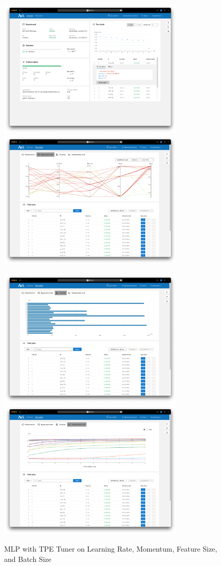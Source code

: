 \documentclass{article}
\begin{document}
\begin{figure}
    \centerline{\includegraphics[width=3.5in]{../proj3/figures/mlp_tpe_batch_overview.png}\includegraphics[width=3.5in]{../proj3/figures/mlp_tpe_batch_hyperparameter.png}}
    \centerline{\includegraphics[width=3.5in]{../proj3/figures/mlp_tpe_batch_latency.png}\includegraphics[width=3.5in]{../proj3/figures/mlp_tpe_batch_intermediate.png}}
    \caption{MLP with TPE Tuner on Learning Rate, Momentum, Feature Size, and Batch Size}
    \label{fig:mlp-tpe-batch}
\end{figure}
\end{document}
